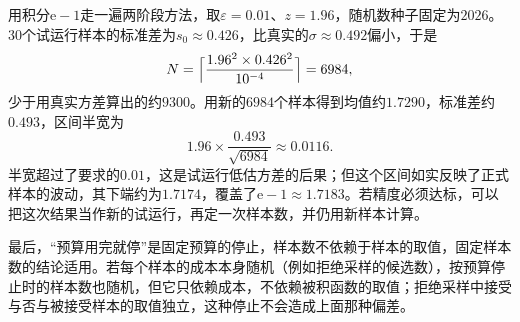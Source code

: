 用积分$\mathrm{e}-1$走一遍两阶段方法，取$\varepsilon=0.01$、$z=1.96$，随机数种子固定为$2026$。$30$个试运行样本的标准差为$s_{0}\approx0.426$，比真实的$\sigma\approx0.492$偏小，于是
\[
  N=\Bigl\lceil\frac{1.96^{2}\times0.426^{2}}{10^{-4}}\Bigr\rceil=6984,
\]
少于用真实方差算出的约$9300$。用新的$6984$个样本得到均值约$1.7290$，标准差约$0.493$，区间半宽为
\[
  1.96\times\frac{0.493}{\sqrt{6984}}\approx0.0116 .
\]
半宽超过了要求的$0.01$，这是试运行低估方差的后果；但这个区间如实反映了正式样本的波动，其下端约为$1.7174$，覆盖了$\mathrm{e}-1\approx1.7183$。若精度必须达标，可以把这次结果当作新的试运行，再定一次样本数，并仍用新样本计算。

最后，“预算用完就停”是固定预算的停止，样本数不依赖于样本的取值，固定样本数的结论适用。若每个样本的成本本身随机（例如拒绝采样的候选数），按预算停止时的样本数也随机，但它只依赖成本，不依赖被积函数的取值；拒绝采样中接受与否与被接受样本的取值独立，这种停止不会造成上面那种偏差。
